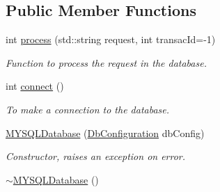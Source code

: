 \subsection*{Public Member Functions}
\begin{DoxyCompactItemize}
\item 
int \hyperlink{classMYSQLDatabase_a2108f42fe84b3f174b87633f533e42b3}{process} (std::string request, int transacId=-\/1)
\begin{DoxyCompactList}\small\item\em Function to process the request in the database. \item\end{DoxyCompactList}\item 
int \hyperlink{classMYSQLDatabase_a3e0dc34a2b20ff76e5fa39cbe340c5d7}{connect} ()
\begin{DoxyCompactList}\small\item\em To make a connection to the database. \item\end{DoxyCompactList}\item 
\hyperlink{classMYSQLDatabase_a69cca4aa62adf08b995908aec1451522}{MYSQLDatabase} (\hyperlink{classDbConfiguration}{DbConfiguration} dbConfig)
\begin{DoxyCompactList}\small\item\em Constructor, raises an exception on error. \item\end{DoxyCompactList}\item 
\hypertarget{classMYSQLDatabase_a5337e67330a1ffa3413a3e9725f1f1c0}{
\hyperlink{classMYSQLDatabase_a5337e67330a1ffa3413a3e9725f1f1c0}{$\sim$MYSQLDatabase} ()}
\label{classMYSQLDatabase_a5337e67330a1ffa3413a3e9725f1f1c0}


\end{DoxyCompactItemize}
